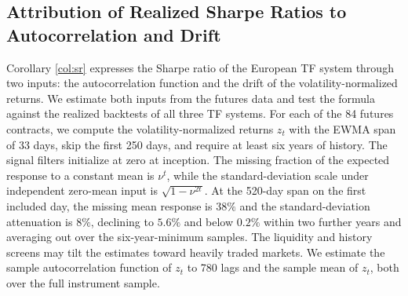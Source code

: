 \documentclass[hidelinks]{siamonline250211}
\begin{document}
\subsection{Attribution of Realized Sharpe Ratios to Autocorrelation and Drift}\label{sec:attr}

Corollary \ref{col:sr} expresses the Sharpe ratio of the European TF system through two inputs: the autocorrelation function and the drift of the volatility-normalized returns. We estimate both inputs from the futures data and test the formula against the realized backtests of all three TF systems. For each of the 84 futures contracts, we compute the volatility-normalized returns $z_{t}$ with the EWMA span of 33 days, skip the first 250 days, and require at least six years of history. The signal filters initialize at zero at inception. The missing fraction of the expected response to a constant mean is $\nu^{t}$, while the standard-deviation scale under independent zero-mean input is $\sqrt{1-\nu^{2t}}$. At the 520-day span on the first included day, the missing mean response is $38\%$ and the standard-deviation attenuation is $8\%$, declining to $5.6\%$ and below $0.2\%$ within two further years and averaging out over the six-year-minimum samples. The liquidity and history screens may tilt the estimates toward heavily traded markets. We estimate the sample autocorrelation function of $z_{t}$ to 780 lags and the sample mean of $z_{t}$, both over the full instrument sample.
\end{document}

